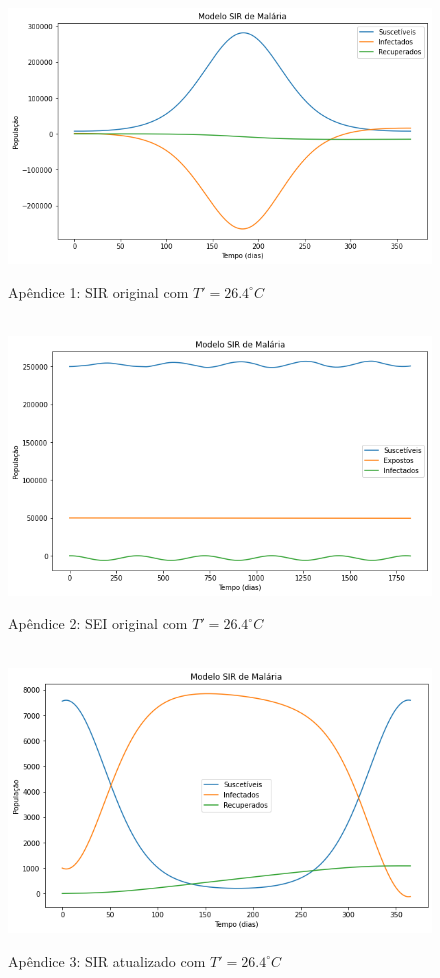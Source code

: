 \documentclass[12pt]{article}
\begin{document}
\begin{figure}[!ht]
        \centering
        \hbox{\hspace{2.0em} \includegraphics[scale=0.55] {SIR_a_incorreto.png}}
        \caption*{Apêndice 1: SIR original com $T'=26.4^\circ C$}
\end{figure} 
\begin{figure}[!ht]
        \centering
        \hbox{\hspace{2.5em} \includegraphics[scale=0.55] {SEI_a_incorreto.png}}
        \caption*{Apêndice 2: SEI original com $T'=26.4^\circ C$}
\end{figure} 
\newpage
\begin{figure}[!ht]
        \centering
        \hbox{\hspace{2.5em} \includegraphics[scale=0.55] {SIR_a_correto.png}}
        \caption*{Apêndice 3: SIR atualizado com $T'=26.4^\circ C$}
\end{figure} 
\end{document}
